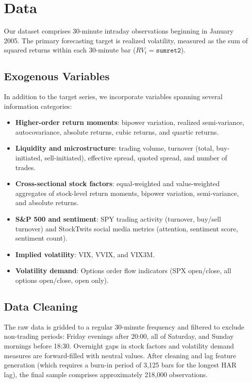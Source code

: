 \section{Data}
\label{sec:data}

Our dataset comprises 30-minute intraday observations beginning in January 2005. The primary forecasting target is realized volatility, measured as the sum of squared returns within each 30-minute bar ($RV_t = \texttt{sumret2}$).

\subsection{Exogenous Variables}
\label{sec:exog_vars}

In addition to the target series, we incorporate variables spanning several information categories:

\begin{itemize}
    \item \textbf{Higher-order return moments}: bipower variation, realized semi-variance, autocovariance, absolute returns, cubic returns, and quartic returns.
    \item \textbf{Liquidity and microstructure}: trading volume, turnover (total, buy-initiated, sell-initiated), effective spread, quoted spread, and number of trades.
    \item \textbf{Cross-sectional stock factors}: equal-weighted and value-weighted aggregates of stock-level return moments, bipower variation, semi-variance, and absolute returns.
    \item \textbf{S\&P 500 and sentiment}: SPY trading activity (turnover, buy/sell turnover) and StockTwits social media metrics (attention, sentiment score, sentiment count).
    \item \textbf{Implied volatility}: VIX, VVIX, and VIX3M.
    \item \textbf{Volatility demand}: Options order flow indicators (SPX open/close, all options open/close, open only).
\end{itemize}

\subsection{Data Cleaning}
\label{sec:cleaning}

The raw data is gridded to a regular 30-minute frequency and filtered to exclude non-trading periods: Friday evenings after 20:00, all of Saturday, and Sunday mornings before 18:30. Overnight gaps in stock factors and volatility demand measures are forward-filled with neutral values. After cleaning and lag feature generation (which requires a burn-in period of 3{,}125 bars for the longest HAR lag), the final sample comprises approximately 218{,}000 observations.
